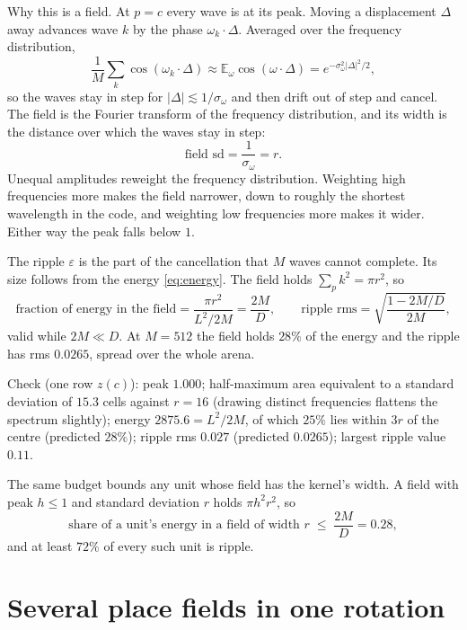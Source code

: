 \documentclass[11pt]{article}
\newcommand{\E}{\mathbb{E}}
\begin{document}
Why this is a field. At $p = c$ every wave is at its peak. Moving a displacement $\Delta$ away
advances wave $k$ by the phase $\omega_k\cdot\Delta$. Averaged over the frequency distribution,
\begin{equation}
  \frac1M\sum_k\cos(\omega_k\!\cdot\Delta) \approx \E_\omega\cos(\omega\cdot\Delta)
  = e^{-\sigma_\omega^2|\Delta|^2/2},
\end{equation}
so the waves stay in step for $|\Delta| \lesssim 1/\sigma_\omega$ and then drift out of step and
cancel. The field is the Fourier transform of the frequency distribution, and its width is the
distance over which the waves stay in step:
\begin{equation}
  \text{field sd} = \frac{1}{\sigma_\omega} = r .
\end{equation}
Unequal amplitudes reweight the frequency distribution. Weighting high frequencies more makes the
field narrower, down to roughly the shortest wavelength in the code, and weighting low frequencies
more makes it wider. Either way the peak falls below $1$.

The ripple $\varepsilon$ is the part of the cancellation that $M$ waves cannot complete. Its size
follows from the energy \eqref{eq:energy}. The field holds $\sum_p k^2 = \pi r^2$, so
\begin{equation}
  \text{fraction of energy in the field} = \frac{\pi r^2}{L^2/2M} = \frac{2M}{D},\qquad
  \text{ripple rms} = \sqrt{\frac{1 - 2M/D}{2M}},
\end{equation}
valid while $2M \ll D$. At $M = 512$ the field holds $28\%$ of the energy and the ripple has rms
$0.0265$, spread over the whole arena.

\noindent Check (one row $z(c)$): peak $1.000$; half-maximum area equivalent to a standard
deviation of $15.3$ cells against $r = 16$ (drawing distinct frequencies flattens the spectrum
slightly); energy $2875.6 = L^2/2M$, of which $25\%$ lies within $3r$ of the centre (predicted
$28\%$); ripple rms $0.027$ (predicted $0.0265$); largest ripple value $0.11$.

The same budget bounds any unit whose field has the kernel's width. A field with peak $h \le 1$
and standard deviation $r$ holds $\pi h^2 r^2$, so
\begin{equation}
  \text{share of a unit's energy in a field of width } r \;\le\; \frac{2M}{D} = 0.28,
\end{equation}
and at least $72\%$ of every such unit is ripple.

\section{Several place fields in one rotation}
\end{document}
